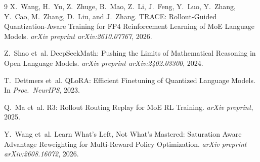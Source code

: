 \documentclass[11pt,a4paper]{article}
\begin{document}
\begin{thebibliography}{9}
X.~Wang, H.~Yu, Z.~Zhuge, B.~Mao, Z.~Li, J.~Feng, Y.~Luo, Y.~Zhang, Y.~Cao, M.~Zhang, D.~Liu, and J.~Zhang.
\newblock TRACE: Rollout-Guided Quantization-Aware Training for FP4 Reinforcement Learning of MoE Language Models.
\newblock \emph{arXiv preprint arXiv:2610.07767}, 2026.

Z.~Shao et~al.
\newblock DeepSeekMath: Pushing the Limits of Mathematical Reasoning in Open Language Models.
\newblock \emph{arXiv preprint arXiv:2402.03300}, 2024.

T.~Dettmers et~al.
\newblock QLoRA: Efficient Finetuning of Quantized Language Models.
\newblock In \emph{Proc.\ NeurIPS}, 2023.

Q.~Ma et~al.
\newblock R3: Rollout Routing Replay for MoE RL Training.
\newblock \emph{arXiv preprint}, 2025.

Y.~Wang et~al.
\newblock Learn What's Left, Not What's Mastered: Saturation Aware Advantage Reweighting for Multi-Reward Policy Optimization.
\newblock \emph{arXiv preprint arXiv:2608.16072}, 2026.
\end{thebibliography}
\end{document}
